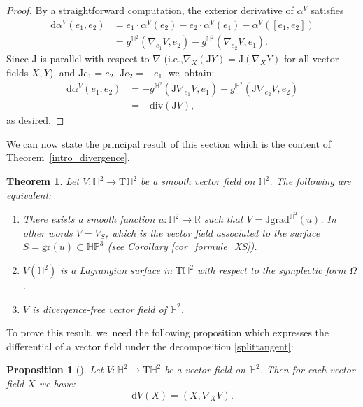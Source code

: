 \documentclass[11pt]{article}
\newcommand{\ie}{i.e.,\xspace}
\theoremstyle{plain}
\newtheorem{theorem}[cor]{Theorem}
\newtheorem{prop}[cor]{Proposition}
\theoremstyle{definition}
\newcommand{\HP}{\mathbb{HP}^3}
\newcommand{\grad}{\mathrm{grad}^{\mathbb{H}^2}}
\newcommand{\J}{\mathrm{J}}
\begin{document}
\begin{proof}
By a straightforward computation, the exterior derivative of \(\alpha^V \) satisfies
\begin{align*}
\mathrm{d} \alpha^V(e_1, e_2)
&= e_1 \cdot \alpha^V(e_2) - e_2 \cdot \alpha^V(e_1) - \alpha^V([e_1, e_2]) \\
&= g^{\mathbb{H}^2}(\nabla_{e_1} V, e_2) - g^{\mathbb{H}^2}(\nabla_{e_2} V, e_1).
\end{align*}
Since \(\mathrm{J} \) is parallel with respect to \(\nabla \) (\ie \(\nabla_X (\mathrm{J}Y) = \mathrm{J}(\nabla_X Y) \) for all vector fields \(X, Y \)), and \(\mathrm{J}e_1 = e_2 \), \(\mathrm{J}e_2 = -e_1 \), we~obtain:
\begin{align*}
\mathrm{d} \alpha^V(e_1, e_2)
&= -g^{\mathbb{H}^2}(\mathrm{J} \nabla_{e_1} V, e_1) - g^{\mathbb{H}^2}(\J\nabla_{e_2} V, e_2) \\
&= -\mathrm{div}(\mathrm{J}V),
\end{align*}
as desired.
\end{proof}

We can now state the principal result of this section which is the content of Theorem~\ref{intro_divergence}.
\begin{theorem}\label{Lagrange_vs_divergence_free}
Let $V:\mathbb{H}^2\to\mathrm{T}\mathbb{H}^2$ be a smooth vector field on $\mathbb{H}^2$. The following are equivalent:
\begin{enumerate}
\item\label{Lagrange_vs_divergence_free1} There exists a smooth function $u:\mathbb{H}^2\to\mathbb{R}$ such that $V=\J\grad(u)$. In other words $V=V_S$, which is the vector field associated to the surface $S=\mathrm{gr}(u)\subset\HP$ (see Corollary \ref{cor_formule_XS}).
\item\label{Lagrange_vs_divergence_free2} $V(\mathbb{H}^2)$ is a \emph{Lagrangian} surface in $\mathrm{T}\mathbb{H}^2$ with respect to the symplectic form $\Omega$.
\item\label{Lagrange_vs_divergence_free3} $V$ is divergence-free vector field of $\mathbb{H}^2$.
\end{enumerate}
\end{theorem}
To prove this result, we~need the following proposition which expresses the differential of a vector field under the decomposition \eqref{splittangent}:
\begin{prop}[{\cite[Prop.\,1.6]{on_harmonic_vector_field}}]\label{dV(X)}
Let $V:\mathbb{H}^2\to\mathrm{T}\mathbb{H}^2$ be a vector field on $\mathbb{H}^2$. Then for each vector field $X$ we have:
\[
\mathrm{d}V(X)=(X,\nabla_XV).
\]
\end{prop}
\end{document}

